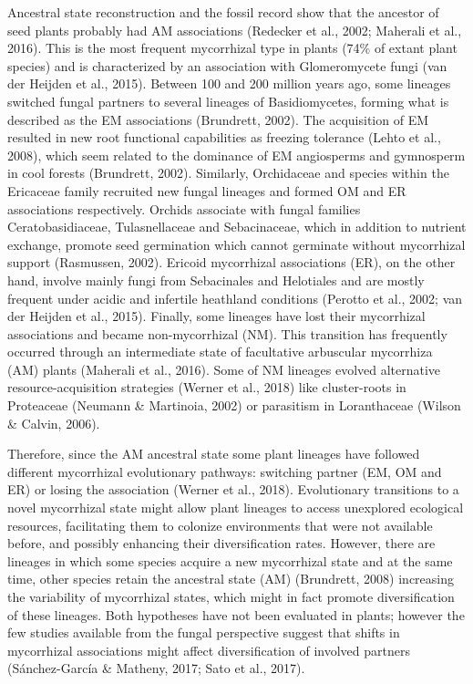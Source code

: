 \documentclass[12pt,]{article}
\begin{document}
Ancestral state reconstruction and the fossil record show that the
ancestor of seed plants probably had AM associations (Redecker et al.,
2002; Maherali et al., 2016). This is the most frequent mycorrhizal type
in plants (74\% of extant plant species) and is characterized by an
association with Glomeromycete fungi (van der Heijden et al., 2015).
Between 100 and 200 million years ago, some lineages switched fungal
partners to several lineages of Basidiomycetes, forming what is
described as the EM associations (Brundrett, 2002). The acquisition of
EM resulted in new root functional capabilities as freezing tolerance
(Lehto et al., 2008), which seem related to the dominance of EM
angiosperms and gymnosperm in cool forests (Brundrett, 2002). Similarly,
Orchidaceae and species within the Ericaceae family recruited new fungal
lineages and formed OM and ER associations respectively. Orchids
associate with fungal families Ceratobasidiaceae, Tulasnellaceae and
Sebacinaceae, which in addition to nutrient exchange, promote seed
germination which cannot germinate without mycorrhizal support
(Rasmussen, 2002). Ericoid mycorrhizal associations (ER), on the other
hand, involve mainly fungi from Sebacinales and Helotiales and are
mostly frequent under acidic and infertile heathland conditions (Perotto
et al., 2002; van der Heijden et al., 2015). Finally, some lineages have
lost their mycorrhizal associations and became non-mycorrhizal (NM).
This transition has frequently occurred through an intermediate state of
facultative arbuscular mycorrhiza (AM) plants (Maherali et al., 2016).
Some of NM lineages evolved alternative resource-acquisition strategies
(Werner et al., 2018) like cluster-roots in Proteaceae (Neumann \&
Martinoia, 2002) or parasitism in Loranthaceae (Wilson \& Calvin, 2006).

Therefore, since the AM ancestral state some plant lineages have
followed different mycorrhizal evolutionary pathways: switching partner
(EM, OM and ER) or losing the association (Werner et al., 2018).
Evolutionary transitions to a novel mycorrhizal state might allow plant
lineages to access unexplored ecological resources, facilitating them to
colonize environments that were not available before, and possibly
enhancing their diversification rates. However, there are lineages in
which some species acquire a new mycorrhizal state and at the same time,
other species retain the ancestral state (AM) (Brundrett, 2008)
increasing the variability of mycorrhizal states, which might in fact
promote diversification of these lineages. Both hypotheses have not been
evaluated in plants; however the few studies available from the fungal
perspective suggest that shifts in mycorrhizal associations might affect
diversification of involved partners (Sánchez-García \& Matheny, 2017;
Sato et al., 2017).
\end{document}
